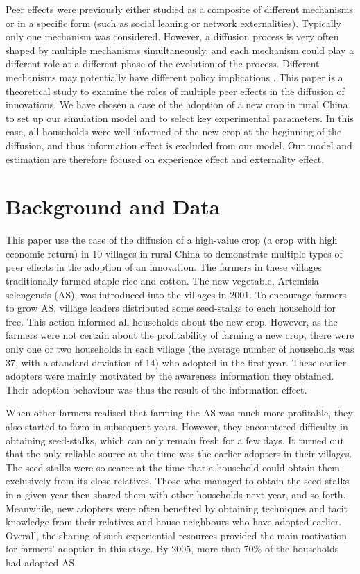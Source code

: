 \documentclass{bmcart}
\begin{document}
Peer effects were previously either studied as a composite of different mechanisms or in a specific form (such as social leaning or network externalities). Typically only one mechanism was considered. However, a diffusion process is very often shaped by multiple mechanisms simultaneously, and each mechanism could play a different role at a different phase of the evolution of the process. Different mechanisms may potentially have different policy implications \cite{Carrell2013, Alcalde2013}. This paper is a theoretical study to examine the roles of multiple peer effects in the diffusion of innovations. We have chosen a case of the adoption of a new crop in rural China to set up our simulation model and to select key experimental parameters. In this case, all households were well informed of the new crop at the beginning of the diffusion, and thus information effect is excluded from our model. Our model and estimation are therefore focused on experience effect and externality effect.  

\section*{Background and Data}
\label{Sec: real-world case}
This paper use the case of the diffusion of a high-value crop (a crop with high economic return) in 10 villages in rural China to demonstrate multiple types of peer effects in the adoption of an innovation. The farmers in these villages traditionally farmed staple rice and cotton. The new vegetable, Artemisia selengensis (AS), was introduced into the villages in 2001. To encourage farmers to grow AS, village leaders distributed some seed-stalks to each household for free. This action informed all households about the new crop. However, as the farmers were not certain about the profitability of farming a new crop, there were only one or two households in each village (the average number of households was 37, with a standard deviation of 14) who adopted in the first year. These earlier adopters were mainly motivated by the awareness information they obtained. Their adoption behaviour was thus the result of the information effect.

When other farmers realised that farming the AS was much more profitable, they also started to farm in subsequent years. However, they encountered difficulty in obtaining seed-stalks, which can only remain fresh for a few days. It turned out that the only reliable source at the time was the earlier adopters in their villages. The seed-stalks were so scarce at the time that a household could obtain them exclusively from its close relatives. Those who managed to obtain the seed-stalks in a given year then shared them with other households next year, and so forth. Meanwhile, new adopters were often benefited by obtaining techniques and tacit knowledge from their relatives and house neighbours who have adopted earlier. Overall, the sharing of such experiential resources provided the main motivation for farmers' adoption in this stage. By 2005, more than 70\% of the households had adopted AS.
\end{document}
